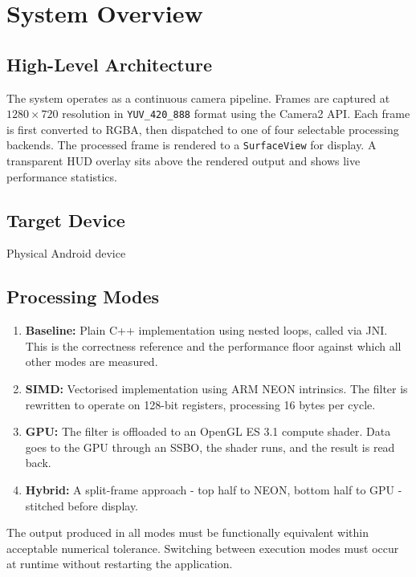 \documentclass[12pt, a4paper]{article}
\begin{document}
\section{System Overview}

\subsection{High-Level Architecture}
The system operates as a continuous camera pipeline. Frames are captured at $1280 \times 720$
resolution in \texttt{YUV\_420\_888} format using the Camera2 API. Each frame is first
converted to RGBA, then dispatched to one of four selectable processing backends. The processed
frame is rendered to a \texttt{SurfaceView} for display. A transparent HUD overlay sits above
the rendered output and shows live performance statistics.

\subsection{Target Device}
Physical Android device

\subsection{Processing Modes}
\begin{enumerate}
    \item \textbf{Baseline:} Plain C++ implementation using nested loops, called via JNI. This
          is the correctness reference and the performance floor against which all other modes
          are measured.
    \item \textbf{SIMD:} Vectorised implementation using ARM NEON intrinsics. The filter is
          rewritten to operate on 128-bit registers, processing 16 bytes per cycle.
    \item \textbf{GPU:} The filter is offloaded to an OpenGL ES 3.1 compute shader. Data goes
          to the GPU through an SSBO, the shader runs, and the result is read back.
    \item \textbf{Hybrid:} A split-frame approach - top half to NEON, bottom half to GPU -
          stitched before display.
\end{enumerate}

The output produced in all modes must be functionally equivalent within acceptable numerical
tolerance. Switching between execution modes must occur at runtime without restarting the
application.
\end{document}
